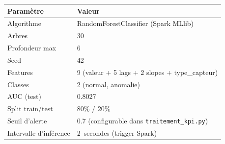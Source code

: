 \documentclass[11pt,a4paper]{article}
\begin{document}
\begin{center}
\small
\begin{tabularx}{\textwidth}{|l|X|}
\hline
\textbf{Paramètre} & \textbf{Valeur} \\
\hline
Algorithme & RandomForestClassifier (Spark MLlib) \\
Arbres & 30 \\
Profondeur max & 6 \\
Seed & 42 \\
Features & 9 (valeur + 5 lags + 2 slopes + type\_capteur) \\
Classes & 2 (normal, anomalie) \\
AUC (test) & 0.8027 \\
Split train/test & 80\% / 20\% \\
Seuil d'alerte & 0.7 (configurable dans \texttt{traitement\_kpi.py}) \\
Intervalle d'inférence & 2~secondes (trigger Spark) \\
\hline
\end{tabularx}
\end{center}
\end{document}
